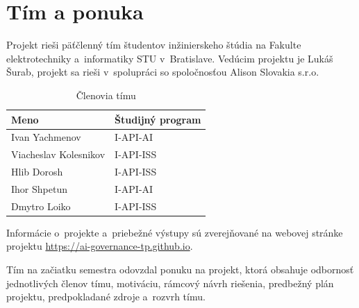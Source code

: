 \section{Tím a ponuka}
\label{sec:tim}

Projekt rieši päťčlenný tím študentov inžinierskeho štúdia na Fakulte
elektrotechniky a~informatiky STU v~Bratislave. Vedúcim projektu je
Lukáš Šurab, projekt sa rieši v~spolupráci so spoločnosťou Alison Slovakia
s.r.o.

\begin{table}[h]
    \centering
    \caption{Členovia tímu}
    \label{tab:tim}
    \begin{tabular}{ll}
        \toprule
        \textbf{Meno} & \textbf{Študijný program} \\
        \midrule
        Ivan Yachmenov        & I-API-AI \\
        Viacheslav Kolesnikov & I-API-ISS \\
        Hlib Dorosh           & I-API-ISS \\
        Ihor Shpetun          & I-API-AI \\
        Dmytro Loiko          & I-API-ISS \\
        \bottomrule
    \end{tabular}
\end{table}

Informácie o~projekte a~priebežné výstupy sú zverejňované na webovej
stránke projektu \url{https://ai-governance-tp.github.io}.

Tím na začiatku semestra odovzdal ponuku na projekt, ktorá obsahuje
odbornosť jednotlivých členov tímu, motiváciu, rámcový návrh riešenia,
predbežný plán projektu, predpokladané zdroje a~rozvrh tímu.
